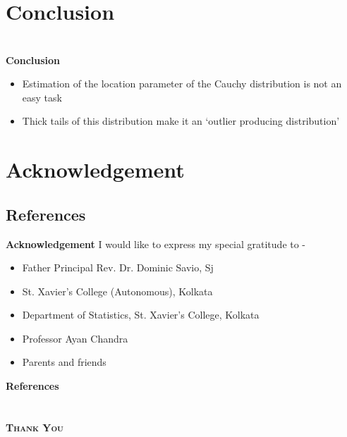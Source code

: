\documentclass{beamer}
\begin{document}
	\section{Conclusion} \section*{}
	\begin{frame}{\textbf{Conclusion}} 
		\begin{itemize} \justifying 
			\item Estimation of the location parameter of the Cauchy distribution is not an easy task \\[8pt]
			\item<2-> Thick tails of this distribution make it an `outlier producing distribution' \\[8pt]
		\end{itemize}
	\end{frame}

	\section*{Acknowledgement}
	\subsection*{References}
	\begin{frame}{\textbf{Acknowledgement}}
		\justifying 
		I would like to express my special gratitude to  - 
		\begin{itemize}
			\item Father Principal Rev. Dr. Dominic Savio, Sj
			\item St. Xavier's College (Autonomous), Kolkata
			\item Department of Statistics, St. Xavier's College, Kolkata
			\item Professor Ayan Chandra
			\item Parents and friends
		\end{itemize}
	\end{frame}

	\begin{frame}{\textbf{References}}
		\scriptsize
		\nocite{*}
		
		
	\end{frame}
	
	\section*{}
	\begin{frame} \begin{center}
		\Huge \textsc{\textbf{Thank You}}
	\end{center} \end{frame}
\end{document}
